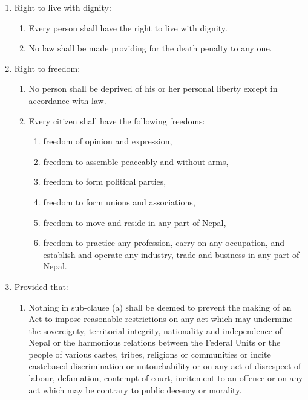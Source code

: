 \begin{questions}
\begin{solution}
  \begin{enumerate}
  \addtocounter{enumiii}{16} %
      \item Right to live with dignity:
      \begin{enumerate}
          \item Every person shall have the right to live with dignity.
          \item No law shall be made providing for the death penalty to any one.
      \end{enumerate}
      \item Right to freedom:
      \begin{enumerate} 
          \item No person shall be deprived of his or her personal liberty except in accordance with law.
          \item Every citizen shall have the following freedoms:
          \begin{enumerate}
              \item freedom of opinion and expression,
              \item freedom to assemble peaceably and without arms,
              \item freedom to form political parties,
              \item freedom to form unions and associations,
              \item freedom to move and reside in any part of Nepal,
              \item freedom to practice any profession, carry on any occupation, and establish and operate any industry, trade and business in any part of Nepal.
          \end{enumerate}
      \end{enumerate}
      \item[] Provided that:
      \begin{enumerate}
          \item Nothing in sub-clause (a) shall be deemed to prevent the making of an Act to impose reasonable restrictions on any act which may undermine the sovereignty, territorial integrity, nationality and independence of Nepal or the harmonious relations between the Federal Units or the people of various castes, tribes, religions or communities or incite castebased discrimination or untouchability or on any act of disrespect of labour, defamation, contempt of court, incitement to an offence or on any act which may be contrary to public decency or morality.

\end{enumerate}
\end{enumerate}
\end{solution}
\end{questions}
